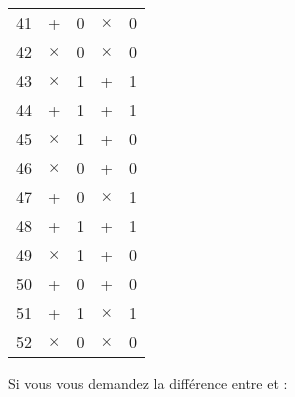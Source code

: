 \begin{longtable}{c|cc|cc}
  41     & +                          & 0                       & $\times$ & 0   \\
  42     & $\times$                   & 0                       & $\times$ & 0   \\
  43     & $\times$                   & 1                       & +        & 1   \\
  44     & +                          & 1                       & +        & 1   \\
  45     & $\times$                   & 1                       & +        & 0   \\
  46     & $\times$                   & 0                       & +        & 0   \\
  47     & +                          & 0                       & $\times$ & 1   \\
  48     & +                          & 1                       & +        & 1   \\
  49     & $\times$                   & 1                       & +        & 0   \\
  50     & +                          & 0                       & +        & 0   \\
  51     & +                          & 1                       & $\times$ & 1   \\
  52     & $\times$                   & 0                       & $\times$ & 0   \\ \hline
  \bottomrule
\end{longtable}


Si vous vous demandez la différence entre  et  : 